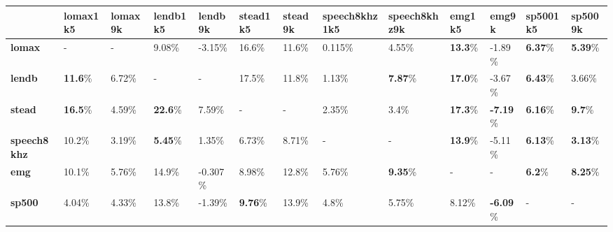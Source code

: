 \begin{table}[]
\begin{adjustwidth}{-1in}{-1in} %
\begin{tabular}{|l|l|l|l|l|l|l|l|l|l|l|l|l|}
\hline
  & \textbf{lomax1k5} & \textbf{lomax9k} & \textbf{lendb1k5} & \textbf{lendb9k} & \textbf{stead1k5} & \textbf{stead9k} & \textbf{speech8khz1k5} & \textbf{speech8khz9k} & \textbf{emg1k5} & \textbf{emg9k} & \textbf{sp5001k5} & \textbf{sp5009k}\\ \hline
\textbf{lomax} & - & - & 9.08\% & -3.15\% & 16.6\% & 11.6\% & 0.115\% & 4.55\% & \cellcolor{green}\textbf{13.3}\% & -1.89\% & \cellcolor{green}\textbf{6.37}\% & \cellcolor{green}\textbf{5.39}\% \\ \hline
\textbf{lendb} & \cellcolor{green}\textbf{11.6}\% & 6.72\% & - & - & 17.5\% & 11.8\% & 1.13\% & \cellcolor{green}\textbf{7.87}\% & \cellcolor{green}\textbf{17.0}\% & -3.67\% & \cellcolor{green}\textbf{6.43}\% & 3.66\% \\ \hline
\textbf{stead} & \cellcolor{green}\textbf{16.5}\% & 4.59\% & \cellcolor{green}\textbf{22.6}\% & 7.59\% & - & - & 2.35\% & 3.4\% & \cellcolor{green}\textbf{17.3}\% & \cellcolor{red}\textbf{-7.19}\% & \cellcolor{green}\textbf{6.16}\% & \cellcolor{green}\textbf{9.7}\% \\ \hline
\textbf{speech8khz} & 10.2\% & 3.19\% & \cellcolor{green}\textbf{5.45}\% & 1.35\% & 6.73\% & 8.71\% & - & - & \cellcolor{green}\textbf{13.9}\% & -5.11\% & \cellcolor{green}\textbf{6.13}\% & \cellcolor{green}\textbf{3.13}\% \\ \hline
\textbf{emg} & 10.1\% & 5.76\% & 14.9\% & -0.307\% & 8.98\% & 12.8\% & 5.76\% & \cellcolor{green}\textbf{9.35}\% & - & - & \cellcolor{green}\textbf{6.2}\% & \cellcolor{green}\textbf{8.25}\% \\ \hline
\textbf{sp500} & 4.04\% & 4.33\% & 13.8\% & -1.39\% & \cellcolor{green}\textbf{9.76}\% & 13.9\% & 4.8\% & 5.75\% & 8.12\% & \cellcolor{red}\textbf{-6.09}\% & - & - \\ \hline
\end{tabular}
\end{adjustwidth}
\end{table}
